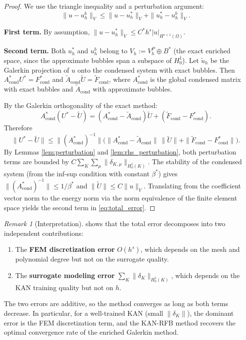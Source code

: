 \documentclass[11pt]{article}
\newcommand{\Vp}{V_h^P}
\newcommand{\dom}{\Omega}
\theoremstyle{remark}
\newtheorem{remark}{Remark}[section]
\begin{document}
\begin{proof}
We use the triangle inequality and a perturbation argument:
\begin{equation}
\|u - u_h^b\|_V \leq \|u - u_h^*\|_V + \|u_h^* - u_h^b\|_V.
\end{equation}

\textbf{First term.} By assumption, $\|u - u_h^*\|_V \leq C^* h^s |u|_{H^{s+1}(\dom)}$.

\textbf{Second term.} Both $u_h^*$ and $u_h^b$ belong to $V_h := \Vp \oplus B^*$ (the exact enriched space, since the approximate bubbles span a subspace of $H_0^1$). Let $\tilde{u}_h$ be the Galerkin projection of $u$ onto the condensed system with exact bubbles. Then $A_{\mathrm{cond}}^* U^* = F_{\mathrm{cond}}^*$ and $\widetilde{A}_{\mathrm{cond}} \widetilde{U} = \widetilde{F}_{\mathrm{cond}}$, where $A_{\mathrm{cond}}^*$ is the global condensed matrix with exact bubbles and $\widetilde{A}_{\mathrm{cond}}$ with approximate bubbles.

By the Galerkin orthogonality of the exact method:
\begin{equation}
A_{\mathrm{cond}}^*(U^* - \widetilde{U}) = (A_{\mathrm{cond}}^* - \widetilde{A}_{\mathrm{cond}})\widetilde{U} + (\widetilde{F}_{\mathrm{cond}} - F_{\mathrm{cond}}^*).
\end{equation}
Therefore
\begin{equation}
\|U^* - \widetilde{U}\| \leq \|(A_{\mathrm{cond}}^*)^{-1}\| \bigl(\|A_{\mathrm{cond}}^* - \widetilde{A}_{\mathrm{cond}}\|\,\|\widetilde{U}\| + \|\widetilde{F}_{\mathrm{cond}} - F_{\mathrm{cond}}^*\|\bigr).
\end{equation}
By Lemmas \ref{lem:perturbation} and \ref{lem:rhs_perturbation}, both perturbation terms are bounded by $C \sum_K \sum_\mu \|\delta_{K,\mu}\|_{H^1_0(K)}$. The stability of the condensed system (from the inf-sup condition with constant $\beta^*$) gives $\|(A_{\mathrm{cond}}^*)^{-1}\| \leq 1/\beta^*$ and $\|\widetilde{U}\| \leq C\|u\|_V$. Translating from the coefficient vector norm to the energy norm via the norm equivalence of the finite element space yields the second term in \eqref{eq:total_error}.
\end{proof}

\begin{remark}[Interpretation]
 shows that the total error decomposes into two independent contributions:
\begin{enumerate}[nosep]
    \item The \textbf{FEM discretization error} $O(h^s)$, which depends on the mesh and polynomial degree but not on the surrogate quality.
    \item The \textbf{surrogate modeling error} $\sum_K \|\delta_K\|_{H^1_0(K)}$, which depends on the KAN training quality but not on $h$.
\end{enumerate}
The two errors are additive, so the method converges as long as both terms decrease. In particular, for a well-trained KAN (small $\|\delta_K\|$), the dominant error is the FEM discretization term, and the KAN-RFB method recovers the optimal convergence rate of the enriched Galerkin method.
\end{remark}
\end{document}
